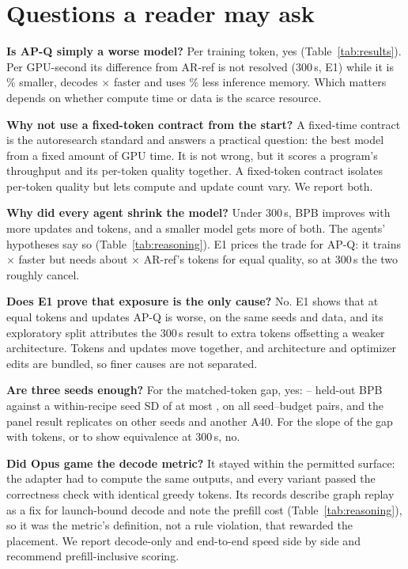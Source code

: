 \documentclass{article}
\begin{document}
\section{Questions a reader may ask}\label{app:faq}
\textbf{Is AP-Q simply a worse model?} Per training token, yes (Table~\ref{tab:results}). Per GPU-second its difference from AR-ref is not resolved (300\,s, E1) while it is \CRParamReduction\% smaller, decodes \CRDecodeRatio$\times$ faster and uses \CRMemoryReduction\% less inference memory. Which matters depends on whether compute time or data is the scarce resource.

\textbf{Why not use a fixed-token contract from the start?} A fixed-time contract is the autoresearch standard and answers a practical question: the best model from a fixed amount of GPU time. It is not wrong, but it scores a program's throughput and its per-token quality together. A fixed-token contract isolates per-token quality but lets compute and update count vary. We report both.

\textbf{Why did every agent shrink the model?} Under 300\,s, BPB improves with more updates and tokens, and a smaller model gets more of both. The agents' hypotheses say so (Table~\ref{tab:reasoning}). E1 prices the trade for AP-Q: it trains \CREOneRho$\times$ faster but needs about \CREOneK$\times$ AR-ref's tokens for equal quality, so at 300\,s the two roughly cancel.

\textbf{Does E1 prove that exposure is the only cause?} No. E1 shows that at equal tokens and updates AP-Q is worse, on the same seeds and data, and its exploratory split attributes the 300\,s result to extra tokens offsetting a weaker architecture. Tokens and updates move together, and architecture and optimizer edits are bundled, so finer causes are not separated.

\textbf{Are three seeds enough?} For the matched-token gap, yes: \CREOneMatchedLoAbs--\CREOneMatchedHiAbs{} held-out BPB against a within-recipe seed SD of at most \CREOneMaxSD, on all \CREOnePairs{} seed--budget pairs, and the panel result replicates on other seeds and another A40. For the slope of the gap with tokens, or to show equivalence at 300\,s, no.

\textbf{Did Opus game the decode metric?} It stayed within the permitted surface: the adapter had to compute the same outputs, and every variant passed the correctness check with identical greedy tokens. Its records describe graph replay as a fix for launch-bound decode and note the prefill cost (Table~\ref{tab:reasoning}), so it was the metric's definition, not a rule violation, that rewarded the placement. We report decode-only and end-to-end speed side by side and recommend prefill-inclusive scoring.
\end{document}
